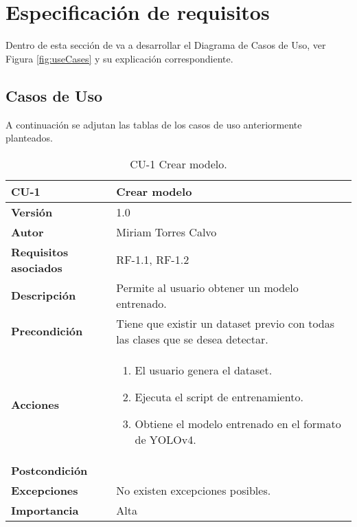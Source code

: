 \section{Especificación de requisitos}
Dentro de esta sección de va a desarrollar el Diagrama de Casos de Uso, ver Figura \ref{fig:useCases} y su explicación correspondiente.

 \label{fig:useCases}

\subsection{Casos de Uso}
A continuación se adjutan las tablas de los casos de uso anteriormente planteados.

\begin{table}[p]
  \centering
  \begin{tabularx}{\linewidth}{ p{} p{} }
  \toprule
  \textbf{CU-1} & \textbf{Crear modelo}\\
  \toprule
  \textbf{Versión} & 1.0\\
  \textbf{Autor} & Miriam Torres Calvo\\
  \textbf{Requisitos asociados} & RF-1.1, RF-1.2\\
  \textbf{Descripción} & Permite al usuario obtener un modelo entrenado.\\
  \textbf{Precondición} & Tiene que existir un dataset previo con todas las clases que se desea detectar.\\
  \textbf{Acciones} &
  \begin{enumerate}
  \def\labelenumi{\arabic{enumi}.}
  \tightlist
  \item El usuario genera el dataset.
  \item Ejecuta el script de entrenamiento.
  \item Obtiene el modelo entrenado en el formato de YOLOv4.
  \end{enumerate}\\
  \textbf{Postcondición} & \\
  \textbf{Excepciones} & No existen excepciones posibles.\\
  \textbf{Importancia} & Alta \\
  \bottomrule
  \end{tabularx}
  \caption{CU-1 Crear modelo.}
\end{table}

